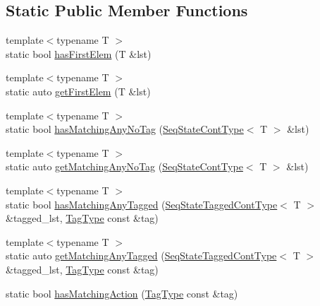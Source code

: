 \subsection*{Static Public Member Functions}
\begin{DoxyCompactItemize}
\item 
{\footnotesize template$<$typename T $>$ }\\static bool \hyperlink{structvt_1_1seq_1_1_seq_matcher_a7dd06bfe1aae5a02abbdecea398bd1ec}{has\+First\+Elem} (T \&lst)
\item 
{\footnotesize template$<$typename T $>$ }\\static auto \hyperlink{structvt_1_1seq_1_1_seq_matcher_a159105deac6c551431f83a6e4923ced2}{get\+First\+Elem} (T \&lst)
\item 
{\footnotesize template$<$typename T $>$ }\\static bool \hyperlink{structvt_1_1seq_1_1_seq_matcher_a5e65d71b69bf341cbb6372898c9e8f4f}{has\+Matching\+Any\+No\+Tag} (\hyperlink{structvt_1_1seq_1_1_seq_matcher_ad8e84a5a494218cd582d8467552b5ff7}{Seq\+State\+Cont\+Type}$<$ T $>$ \&lst)
\item 
{\footnotesize template$<$typename T $>$ }\\static auto \hyperlink{structvt_1_1seq_1_1_seq_matcher_a2fbb578d7c1950e56c572fb5e32dc212}{get\+Matching\+Any\+No\+Tag} (\hyperlink{structvt_1_1seq_1_1_seq_matcher_ad8e84a5a494218cd582d8467552b5ff7}{Seq\+State\+Cont\+Type}$<$ T $>$ \&lst)
\item 
{\footnotesize template$<$typename T $>$ }\\static bool \hyperlink{structvt_1_1seq_1_1_seq_matcher_a0cf869347d07625d6a5bc77e10b7e6e3}{has\+Matching\+Any\+Tagged} (\hyperlink{structvt_1_1seq_1_1_seq_matcher_aeddaef880aa6f0dcc59486374d59a4cb}{Seq\+State\+Tagged\+Cont\+Type}$<$ T $>$ \&tagged\+\_\+lst, \hyperlink{namespacevt_a84ab281dae04a52a4b243d6bf62d0e52}{Tag\+Type} const \&tag)
\item 
{\footnotesize template$<$typename T $>$ }\\static auto \hyperlink{structvt_1_1seq_1_1_seq_matcher_adc1e8331b331d9e289c5cb79c912ca1c}{get\+Matching\+Any\+Tagged} (\hyperlink{structvt_1_1seq_1_1_seq_matcher_aeddaef880aa6f0dcc59486374d59a4cb}{Seq\+State\+Tagged\+Cont\+Type}$<$ T $>$ \&tagged\+\_\+lst, \hyperlink{namespacevt_a84ab281dae04a52a4b243d6bf62d0e52}{Tag\+Type} const \&tag)
\item 
static bool \hyperlink{structvt_1_1seq_1_1_seq_matcher_abfa4be73ab940bb63c3741ef3dcf6834}{has\+Matching\+Action} (\hyperlink{namespacevt_a84ab281dae04a52a4b243d6bf62d0e52}{Tag\+Type} const \&tag)

\end{DoxyCompactItemize}
